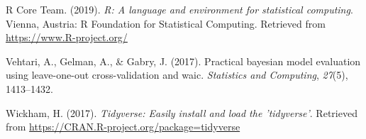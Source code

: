 \documentclass[10pt, letterpaper]{article}
\begin{document}
\leavevmode\hypertarget{ref-rcore}{}%
R Core Team. (2019). \emph{R: A language and environment for statistical
computing}. Vienna, Austria: R Foundation for Statistical Computing.
Retrieved from \url{https://www.R-project.org/}

\leavevmode\hypertarget{ref-vehtari2017practical}{}%
Vehtari, A., Gelman, A., \& Gabry, J. (2017). Practical bayesian model
evaluation using leave-one-out cross-validation and waic.
\emph{Statistics and Computing}, \emph{27}(5), 1413--1432.

\leavevmode\hypertarget{ref-tidy}{}%
Wickham, H. (2017). \emph{Tidyverse: Easily install and load the
'tidyverse'}. Retrieved from
\url{https://CRAN.R-project.org/package=tidyverse}


\end{document}
